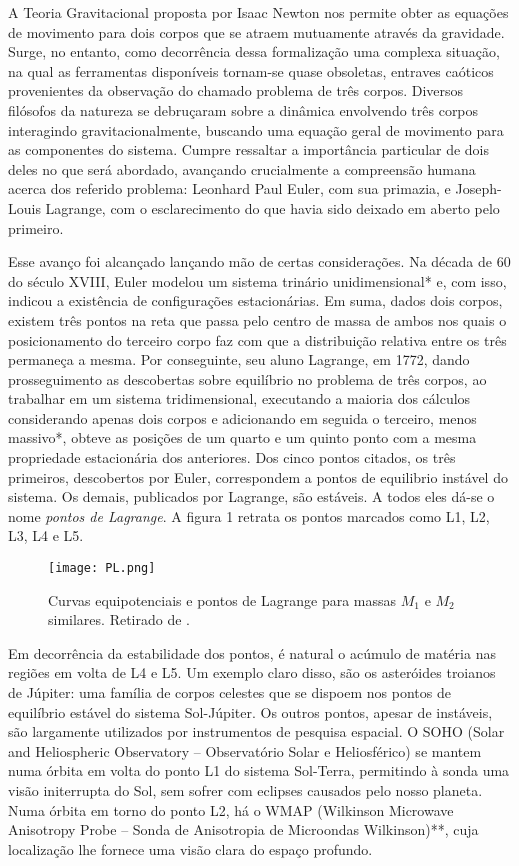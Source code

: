 A Teoria Gravitacional proposta por Isaac Newton nos permite obter as equações de movimento para  dois corpos que se atraem mutuamente através da gravidade. Surge, no entanto, como decorrência dessa formalização uma complexa situação, na qual as ferramentas disponíveis tornam-se quase obsoletas, entraves caóticos provenientes da observação do chamado problema de três corpos. Diversos filósofos da natureza se debruçaram sobre a dinâmica envolvendo três corpos interagindo gravitacionalmente, buscando uma equação geral de movimento para as componentes do sistema. Cumpre ressaltar a importância particular de dois deles no que será abordado, avançando crucialmente a compreensão humana acerca dos referido problema: Leonhard Paul Euler, com sua primazia, e Joseph-Louis Lagrange, com o esclarecimento do que havia sido deixado em aberto pelo primeiro.
   
Esse avanço foi alcançado lançando mão de certas considerações. Na década de 60 do século XVIII, Euler modelou um sistema trinário unidimensional* e, com isso, indicou a existência de configurações estacionárias. Em suma, dados dois corpos, existem três pontos na reta que passa pelo centro de massa de ambos nos quais o posicionamento do terceiro corpo faz com que a distribuição relativa entre os três permaneça a mesma. Por conseguinte, seu aluno Lagrange, em 1772, dando prosseguimento as descobertas sobre equilíbrio no problema de três corpos, ao trabalhar em um sistema tridimensional, executando a maioria dos cálculos considerando apenas dois corpos e adicionando em seguida o terceiro, menos massivo*, obteve as posições de um quarto e um quinto ponto com a mesma propriedade estacionária dos anteriores. Dos cinco pontos citados, os três primeiros, descobertos por Euler, correspondem a pontos de equilibrio instável do sistema. Os demais, publicados por Lagrange, são estáveis. A todos eles dá-se o nome \textit{pontos de Lagrange}. A figura 1 retrata os pontos marcados como L1, L2, L3, L4 e L5.

\begin{figure}[!h]
\centering
\texttt{[image: PL.png]}
\caption{Curvas equipotenciais e pontos de Lagrange para massas $M_1$ e $M_2$ similares. Retirado de \cite[figura 23.68, p. 526]{ksouza}.}
\end{figure}
   
Em decorrência da estabilidade dos pontos, é natural o acúmulo de matéria nas regiões em volta de L4 e L5. Um exemplo claro disso, são os asteróides troianos de Júpiter: uma família de corpos celestes que se dispoem nos pontos de equilíbrio estável do sistema Sol-Júpiter. Os outros pontos, apesar de instáveis, são largamente utilizados por instrumentos de pesquisa espacial. O SOHO (Solar and Heliospheric Observatory -- Observatório Solar e Heliosférico) \cite{} se mantem numa órbita em volta do ponto L1 do sistema Sol-Terra, permitindo à sonda uma visão initerrupta do Sol, sem sofrer com eclipses causados pelo nosso planeta. Numa órbita em torno do ponto L2, há o WMAP (Wilkinson Microwave Anisotropy Probe -- Sonda de Anisotropia de Microondas Wilkinson)**, cuja localização lhe fornece uma visão clara do espaço profundo.



